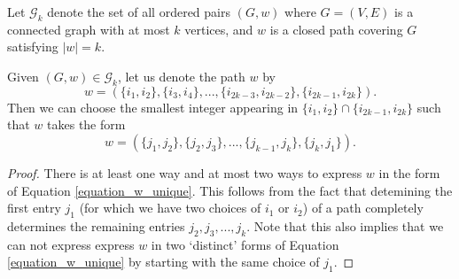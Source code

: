 \begin{definition}
  \label{def:g_k}
  Let $\mathcal{G}_k$ denote the set of all ordered pairs $(G,w)$ where $G = (V,E)$ is a connected graph with at most $k$ vertices, and
  $w$ is a closed path covering $G$ satisfying $|w| = k$.
\end{definition}
\begin{lemma}
  \label{lem:w_unique}
  Given $(G,w) \in \mathcal{G}_k$, let us denote the path $w$ by
  \[
  w = (\{i_1,i_2\},\{i_3,i_4\},...,\{i_{2k-3},i_{2k-2}\},\{i_{2k-1},i_{2k}\}).
  \] 
  Then we can choose the smallest integer appearing in $\{i_1,i_2\} \cap \{i_{2k-1},i_{2k}\}$ such that $w$ takes the form
  \begin{equation}\label{equation_w_unique}
  w = (\{j_1,j_2\},\{j_2,j_3\},...,\{j_{k-1},j_k\},\{j_k,j_1\}).
  \end{equation} 
\end{lemma}
\begin{proof}
  There is at least one way and at most two ways to express $w$ in the form of Equation \ref{equation_w_unique}.
  This follows from the fact that detemining the first entry $j_1$ (for which we have two choices of $i_1$ or $i_2$) of a path completely determines the remaining entries $j_2,j_3,...,j_k$. 
  Note that this also implies that we can not express express $w$ in two `distinct' forms of Equation \ref{equation_w_unique} by starting with the same choice of $j_1$.
\end{proof}
